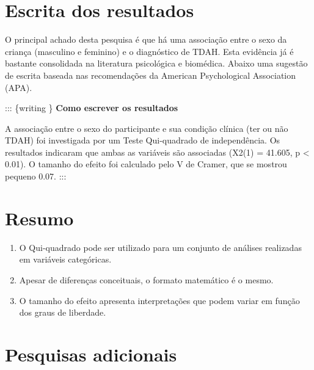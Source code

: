 \documentclass[
]{book}
\providecommand{\tightlist}{%
  \setlength{\itemsep}{0pt}\setlength{\parskip}{0pt}}
\begin{document}
\hypertarget{escrita-dos-resultados}{%
\section{Escrita dos resultados}\label{escrita-dos-resultados}}

O principal achado desta pesquisa é que há uma associação entre o sexo da criança (masculino e feminino) e o diagnóstico de TDAH. Esta evidência já é bastante consolidada na literatura psicológica e biomédica. Abaixo uma sugestão de escrita baseada nas recomendações da American Psychological Association (APA).

::: \{writing \}
\textbf{Como escrever os resultados}

A associação entre o sexo do participante e sua condição clínica (ter ou não TDAH) foi investigada por um Teste Qui-quadrado de independência. Os resultados indicaram que ambas as variáveis são associadas (X2(1) = 41.605, p \textless{} 0.01). O tamanho do efeito foi calculado pelo V de Cramer, que se mostrou pequeno 0.07.
:::

\hypertarget{resumo-6}{%
\section{Resumo}\label{resumo-6}}

\begin{enumerate}
\def\labelenumi{\arabic{enumi}.}
\tightlist
\item
  O Qui-quadrado pode ser utilizado para um conjunto de análises realizadas em variáveis categóricas.\\
\item
  Apesar de diferenças conceituais, o formato matemático é o mesmo.\\
\item
  O tamanho do efeito apresenta interpretações que podem variar em função dos graus de liberdade.\\
\end{enumerate}

\hypertarget{pesquisas-adicionais-1}{%
\section{Pesquisas adicionais}\label{pesquisas-adicionais-1}}
\end{document}
